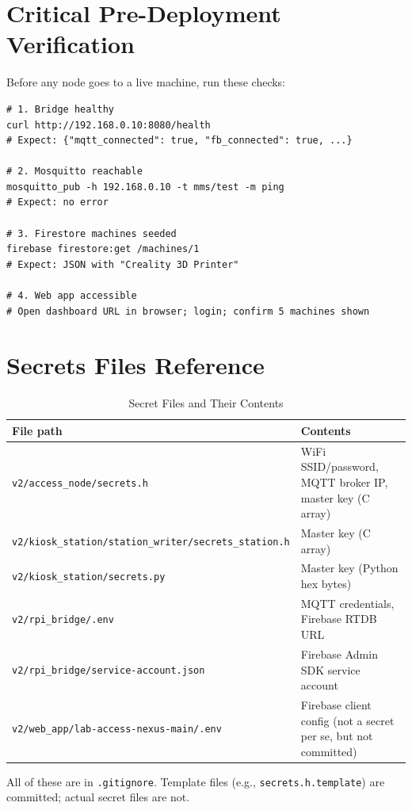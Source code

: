 \section{Critical Pre-Deployment Verification}

Before any node goes to a live machine, run these checks:

\begin{lstlisting}[style=bashstyle]
# 1. Bridge healthy
curl http://192.168.0.10:8080/health
# Expect: {"mqtt_connected": true, "fb_connected": true, ...}

# 2. Mosquitto reachable
mosquitto_pub -h 192.168.0.10 -t mms/test -m ping
# Expect: no error

# 3. Firestore machines seeded
firebase firestore:get /machines/1
# Expect: JSON with "Creality 3D Printer"

# 4. Web app accessible
# Open dashboard URL in browser; login; confirm 5 machines shown
\end{lstlisting}

\section{Secrets Files Reference}

\begin{table}[H]
\centering
\caption{Secret Files and Their Contents}
\begin{tabular}{L{6cm}L{8cm}}
\toprule
\textbf{File path} & \textbf{Contents} \\
\midrule
\texttt{v2/access\_node/secrets.h} & WiFi SSID/password, MQTT broker IP, master key (C array) \\
\texttt{v2/kiosk\_station/station\_writer/secrets\_station.h} & Master key (C array) \\
\texttt{v2/kiosk\_station/secrets.py} & Master key (Python hex bytes) \\
\texttt{v2/rpi\_bridge/.env} & MQTT credentials, Firebase RTDB URL \\
\texttt{v2/rpi\_bridge/service-account.json} & Firebase Admin SDK service account \\
\texttt{v2/web\_app/lab-access-nexus-main/.env} & Firebase client config (not a secret per se, but not committed) \\
\bottomrule
\end{tabular}
\end{table}

All of these are in \texttt{.gitignore}. Template files (e.g., \texttt{secrets.h.template}) are committed; actual secret files are not.
